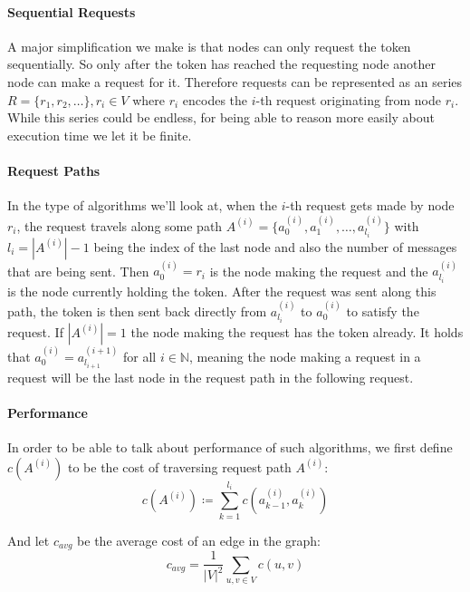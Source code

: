 \documentclass[a4paper, oneside]{discothesis}
\begin{document}
\paragraph{Sequential Requests} A major simplification we make is that nodes can only request the token sequentially. So only after the token has reached the requesting node another node can make a request for it. Therefore requests can be represented as an series $R=\{r_1,r_2,\dots\},r_i\in V$ where $r_i$ encodes the $i$-th request originating from node $r_i$. While this series could be endless, for being able to reason more easily about execution time we let it be finite.

\paragraph{Request Paths} In the type of algorithms we'll look at, when the $i$-th request gets made by node $r_i$, the request travels along some path $A^{(i)}=\{a^{(i)}_0,a^{(i)}_1,\dots,a^{(i)}_{l_i}\}$ with $l_i=|A^{(i)}|-1$ being the index of the last node and also the number of messages that are being sent. Then $a^{(i)}_0=r_i$ is the node making the request and the $a^{(i)}_{l_i}$ is the node currently holding the token. After the request was sent along this path, the token is then sent back directly from $a^{(i)}_{l_i}$ to $a^{(i)}_0$ to satisfy the request. If $|A^{(i)}|=1$ the node making the request has the token already. It holds that $a^{(i)}_0=a^{(i+1)}_{l_{i+1}}$ for all $i\in\mathbb{N}$, meaning the node making a request in a request will be the last node in the request path in the following request.

\paragraph{Performance}\label{model-perf} In order to be able to talk about performance of such algorithms, we first define $c(A^{(i)})$ to be the cost of traversing request path $A^{(i)}$:
\begin{equation}
c(A^{(i)})\coloneqq\sum_{k=1}^{l_i}c(a^{(i)}_{k-1}, a^{(i)}_k)
\end{equation}

And let $c_{avg}$ be the average cost of an edge in the graph:
\begin{equation}
c_{avg}=\frac{1}{|V|^2}\sum_{u,v\in V}c(u,v)
\end{equation}
\end{document}
